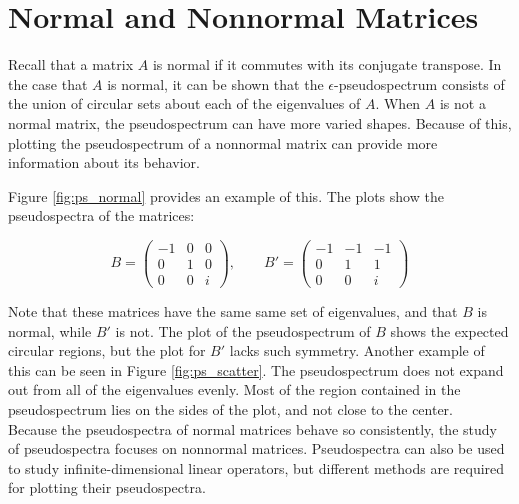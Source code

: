 \section*{Normal and Nonnormal Matrices}
Recall that a matrix $A$ is normal if it commutes with its conjugate transpose. In the case that $A$ is normal, it can be shown that the $\epsilon$-pseudospectrum consists of the union of circular sets about each of the eigenvalues of $A$. When $A$ is not a normal matrix, the pseudospectrum can have more varied shapes. Because of this, plotting the pseudospectrum of a nonnormal matrix can provide more information about its behavior.

Figure \ref{fig:ps_normal} provides an example of this. The plots show the pseudospectra of the matrices:

\begin{equation}
	B = \begin{pmatrix}
		-1 & 0 & 0\\
		0 & 1 & 0\\
		0 & 0 & i
	\end{pmatrix}, \qquad 	B' = \begin{pmatrix}
		-1 & -1 & -1\\
		0 & 1 & 1\\
		0 & 0 & i
	\end{pmatrix}
\end{equation}

Note that these matrices have the same same set of eigenvalues, and that $B$ is normal, while $B'$ is not. The plot of the pseudospectrum of $B$ shows the expected circular regions, but the plot for $B'$ lacks such symmetry. Another example of this can be seen in Figure \ref{fig:ps_scatter}. The pseudospectrum does not expand out from all of the eigenvalues evenly. Most of the region contained in the pseudospectrum lies on the sides of the plot, and not close to the center.\\

Because the pseudospectra of normal matrices behave so consistently, the study of pseudospectra focuses on nonnormal matrices. Pseudospectra can also be used to study infinite-dimensional linear operators, but different methods are required for plotting their pseudospectra.

